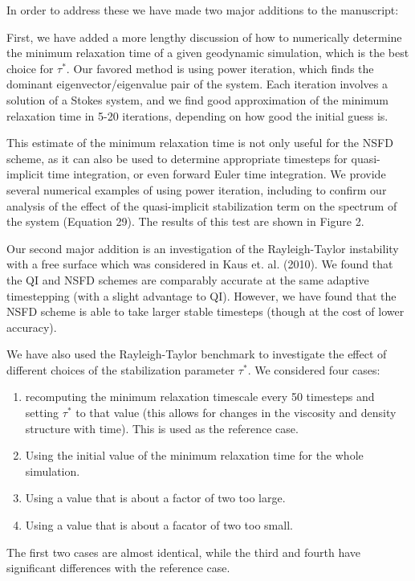 \documentclass[a4paper,12pt]{article}
\begin{document}
In order to address these we have made two major additions to the manuscript:

First, we have added a more lengthy discussion of how to numerically determine the minimum relaxation time of
a given geodynamic simulation, which is the best choice for $\tau^*$. Our favored method
is using power iteration, which finds the dominant eigenvector/eigenvalue pair of the system.
Each iteration involves a solution of a Stokes system, and we find good approximation of the minimum
relaxation time in 5-20 iterations, depending on how good the initial guess is.

This estimate of the minimum relaxation time is not only useful for the NSFD scheme,
as it can also be used to determine appropriate timesteps for quasi-implicit time integration,
or even forward Euler time integration. 
We provide several numerical examples of using power iteration, including to confirm our analysis
of the effect of the quasi-implicit stabilization term on the spectrum of the system (Equation 29).
The results of this test are shown in Figure 2.

Our second major addition is an investigation of the Rayleigh-Taylor instability with a free surface
which was considered in Kaus et. al. (2010). We found that the QI and NSFD schemes are comparably
accurate at the same adaptive timestepping (with a slight advantage to QI). However, we have found
that the NSFD scheme is able to take larger stable timesteps (though at the cost of lower accuracy).

We have also used the Rayleigh-Taylor benchmark to investigate the effect of different choices of 
the stabilization parameter $\tau^*$. We considered four cases: 
\begin{enumerate}
  \item recomputing the minimum relaxation timescale every 50 timesteps and setting $\tau^*$ to that value 
    (this allows for changes in the viscosity and density structure with time). This is used as the reference case.
  \item Using the initial value of the minimum relaxation time for the whole simulation.
  \item Using a value that is about a factor of two too large.
  \item Using a value that is about a facator of two too small.
\end{enumerate}
The first two cases are almost identical, while the third and fourth have significant differences with the reference case. 
\end{document}

